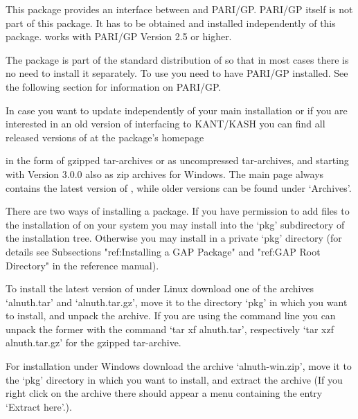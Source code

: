 

This package provides an interface between {\GAP} and PARI/GP. 
PARI/GP itself is not part of this package.  It has to be obtained and
installed independently of this package. {\Alnuth} works with PARI/GP
Version 2.5 or higher.


The package {\Alnuth} is part of the standard distribution of {\GAP} so that
in most cases there is no need to install it separately. To use {\Alnuth}
you need to have PARI/GP installed. See the following section for
information on PARI/GP.

In case you want to update {\Alnuth} independently of your main {\GAP}
installation or if you are interested in an old version of {\Alnuth}
interfacing to KANT/KASH you can find all released versions of {\Alnuth}
at the package's homepage

in the form of gzipped tar-archives or as uncompressed tar-archives,
and starting with Version 3.0.0 also as zip archives for Windows. The
main page always contains the latest version of {\Alnuth}, while older
versions can be found under `Archives'.

There are two ways of installing a {\GAP} package. If you have
permission to add files to the installation of {\GAP} on your system
you may install {\Alnuth} into the `pkg' subdirectory of the {\GAP}
installation tree. Otherwise you may install {\Alnuth} in a private
`pkg' directory (for details see Subsections "ref:Installing a GAP
Package" and "ref:GAP Root Directory" in the {\GAP} reference manual).

To install the latest version of {\Alnuth} under Linux download one of
the archives `alnuth.tar' and `alnuth.tar.gz', move it to the
directory `pkg' in which you want to install, and unpack the
archive. If you are using the command line you can unpack the former
with the command `tar xf alnuth.tar', respectively `tar xzf
alnuth.tar.gz' for the gzipped tar-archive.

For installation under Windows download the archive `alnuth-win.zip',
move it to the `pkg' directory in which you want to install, and
extract the archive (If you right click on the archive there should
appear a menu containing the entry `Extract here'.).

 
